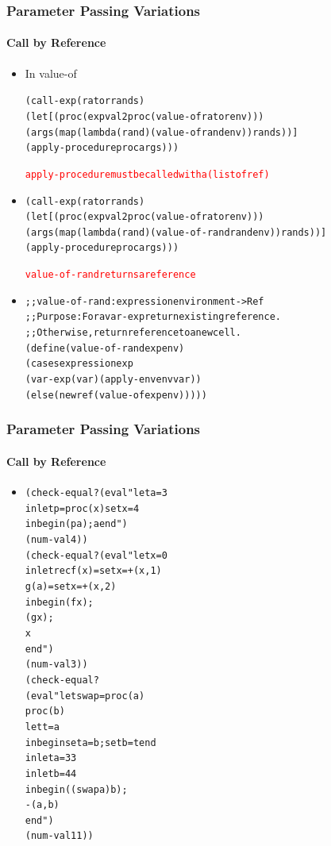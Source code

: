 \documentclass{beamer}
\begin{document}
\begin{frame}[fragile]
\frametitle{Parameter Passing Variations}
\framesubtitle{Call by Reference}
\begin{scriptsize}
\begin{itemize}
\item<1-> In value-of
\begin{alltt}
(call-exp (rator rands)
  (let [(proc (expval2proc (value-of rator env)))
        (args (map (lambda (rand) (value-of rand env)) rands))]
    (apply-procedure proc args)))
    
\textcolor{red}{apply-procedure must be called with a (listof ref)}
\end{alltt}

\item<2->
\begin{alltt}
(call-exp (rator rands)
  (let [(proc (expval2proc (value-of rator env)))
        (args (map (lambda (rand) (value-of-rand rand env)) rands))]
    (apply-procedure proc args)))
    
\textcolor{red}{value-of-rand returns a reference}
\end{alltt}

\item<3->
\begin{alltt}
;; value-of-rand : expression environment -> Ref
;; Purpose: For a var-exp return existing reference.
;;          Otherwise, return reference to a new cell.
(define (value-of-rand exp env)
  (cases expression exp
    (var-exp (var) (apply-env env var))
    (else (newref (value-of exp env)))))
\end{alltt}

\end{itemize}
\end{scriptsize}
\end{frame}

\begin{frame}[fragile]
\frametitle{Parameter Passing Variations}
\framesubtitle{Call by Reference}
\begin{scriptsize}
\begin{itemize}
\item<1-> 
\begin{alltt}
(check-equal? (eval "let a = 3
                     in let p = proc (x) set x = 4
                        in begin (p a); a end")
              (num-val 4))
(check-equal? (eval "let x = 0
                     in letrec f (x) = set x = +(x, 1)
                               g (a) = set x = +(x, 2)
                        in begin (f x);
                                 (g x);
                                 x
                           end")
              (num-val 3))
(check-equal?
 (eval "let swap = proc (a)
                    proc (b)
                      let t = a
                      in begin set a = b;  set b = t  end
        in let a = 33
           in let b = 44
              in begin ((swap a) b);
                       -(a, b)
                 end")
 (num-val 11))
\end{alltt}

\end{itemize}
\end{scriptsize}
\end{frame}
\end{document}
